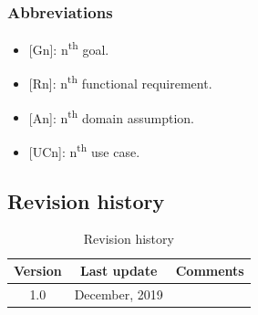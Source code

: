 \documentclass{article}
\begin{document}
		\subsubsection{Abbreviations}
		\begin{itemize}
			\item {[Gn]}: n\textsuperscript{th} goal.
			\item {[Rn]}: n\textsuperscript{th} functional requirement.
			\item {[An]}: n\textsuperscript{th} domain assumption.
			\item {[UCn]}: n\textsuperscript{th} use case.
		\end{itemize}
		\subsection{Revision history}
			\begin{table}[h]
				\centering
				\begin{tabular}{c c c}
					\hline
					\textbf{Version} & \textbf{Last update} & \textbf{Comments} \\ 
					\hline
					1.0 &  \nth{9} December, 2019  & \\
					\hline
				\end{tabular}
				\caption{Revision history}
				\label{fig:Revision history}
			\end{table}
\end{document}
